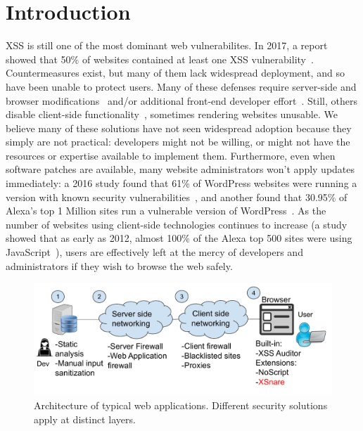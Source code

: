 \section{Introduction} \label{introduction}

\ac{XSS} is still one of the most dominant web
vulnerabilites. In 2017, a report showed that 50\% of websites
contained at least one \ac{XSS} vulnerability~\cite{Acunetix}. Countermeasures
exist, but many of them lack widespread deployment, and so have been unable to protect users.
Many of these defenses require server-side and browser modifications~\cite{Jim:2007:DSI:1242572.1242654,Nadji:2009,Wurzinger:2009:SMX:1656360.1656379,10.1007/978-3-642-31540-4_17} and/or additional front-end developer effort~\cite{10.1007/978-3-319-66399-9_7}. Still, others disable client-side
functionality~\cite{Noscript,Snyder:2017:MWD:3133956.3133966},
sometimes rendering websites unusable. We believe many of these
solutions have not seen widespread adoption because they simply are
not practical: developers might not be willing, or might not have the
resources or expertise available to implement them. Furthermore, even
when software patches are available, many website
administrators won't apply updates immediately: a 2016 study found that
61\% of WordPress websites were running a version with known security
vulnerabilities~\cite{Sucuri}, and another found that 30.95\% of
Alexa's top 1 Million sites run a vulnerable version of WordPress~\cite{wpwhitesecurity}.
As the number of websites using client-side
technologies continues to increase (a study showed that as early as
2012, almost 100\% of the Alexa top 500 sites were using
JavaScript~\cite{Stock:2017:WTI:3241189.3241265}), users are effectively left at
the mercy of developers and administrators if they wish to browse the
web safely.


\begin{figure}[h]
  \includegraphics[scale=0.37]{img/web_app_architecture_one.pdf}
  \vspace*{-5.0ex}
  \caption{Architecture of typical web applications. Different security solutions apply at distinct layers.}
  \label{fig:web_architecture}
\end{figure}

